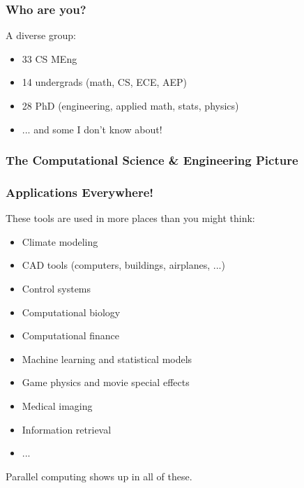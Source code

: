 \documentclass{beamer}
\begin{document}
\begin{frame}
  \frametitle{Who are you?}

  A diverse group:
  \begin{itemize}
  \item 33 CS MEng 
  \item 14 undergrads (math, CS, ECE, AEP)
  \item 28 PhD (engineering, applied math, stats, physics)
  \item ... and some I don't know about!
  \end{itemize}
\end{frame}

\begin{frame}
  \frametitle{The Computational Science \& Engineering Picture}

  \begin{center}
  \end{center}
\end{frame}

\begin{frame}
  \frametitle{Applications Everywhere!}

  These tools are used in more places than you might think:
  \begin{itemize}
  \item Climate modeling
  \item CAD tools (computers, buildings, airplanes, ...)
  \item Control systems
  \item Computational biology
  \item Computational finance
  \item Machine learning and statistical models
  \item Game physics and movie special effects
  \item Medical imaging
  \item Information retrieval
  \item ...
  \end{itemize}
  Parallel computing shows up in all of these.

\end{frame}
\end{document}
